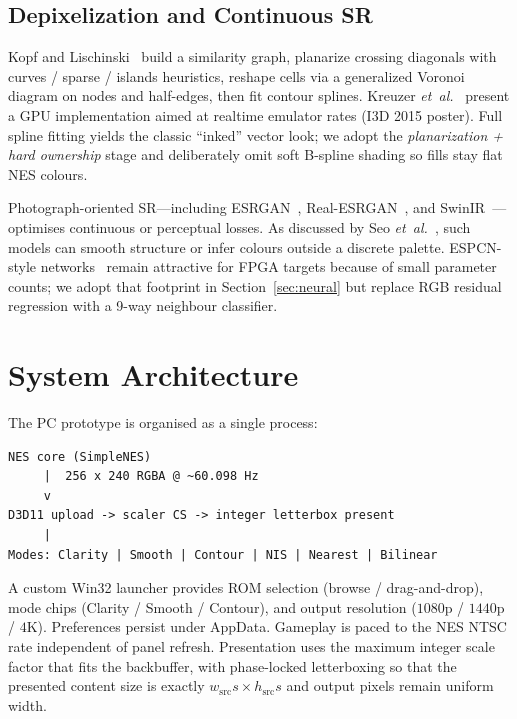 \documentclass[conference]{IEEEtran}
\begin{document}
\subsection{Depixelization and Continuous SR}
Kopf and Lischinski~\cite{kopf2011} build a similarity graph, planarize
crossing diagonals with curves / sparse / islands heuristics, reshape cells
via a generalized Voronoi diagram on nodes and half-edges, then fit contour
splines. Kreuzer \emph{et~al.}~\cite{kreuzer2015} present a GPU
implementation aimed at realtime emulator rates (I3D 2015 poster). Full spline
fitting yields the classic ``inked'' vector look; we adopt the
\emph{planarization + hard ownership} stage and deliberately omit soft
B-spline shading so fills stay flat NES colours.

Photograph-oriented SR---including ESRGAN~\cite{wang2018esrgan},
Real-ESRGAN~\cite{wang2021realesrgan}, and SwinIR~\cite{liang2021swinir}---
optimises continuous or perceptual losses. As discussed by Seo
\emph{et~al.}~\cite{seo2026structure}, such models can smooth structure or
infer colours outside a discrete palette. ESPCN-style
networks~\cite{shi2016} remain attractive for FPGA targets because of small
parameter counts; we adopt that footprint in Section~\ref{sec:neural} but
replace RGB residual regression with a 9-way neighbour classifier.

\section{System Architecture}
\label{sec:arch}

The PC prototype is organised as a single process:
\begin{lstlisting}
NES core (SimpleNES)
     |  256 x 240 RGBA @ ~60.098 Hz
     v
D3D11 upload -> scaler CS -> integer letterbox present
     |
Modes: Clarity | Smooth | Contour | NIS | Nearest | Bilinear
\end{lstlisting}

A custom Win32 launcher provides ROM selection (browse / drag-and-drop), mode
chips (Clarity / Smooth / Contour), and output resolution ($1080$p / $1440$p /
$4$K). Preferences persist under AppData. Gameplay is paced to the NES NTSC
rate independent of panel refresh. Presentation uses the maximum integer scale
factor that fits the backbuffer, with phase-locked letterboxing so that the
presented content size is exactly $w_{\mathrm{src}}s\times h_{\mathrm{src}}s$
and output pixels remain uniform width.
\end{document}
